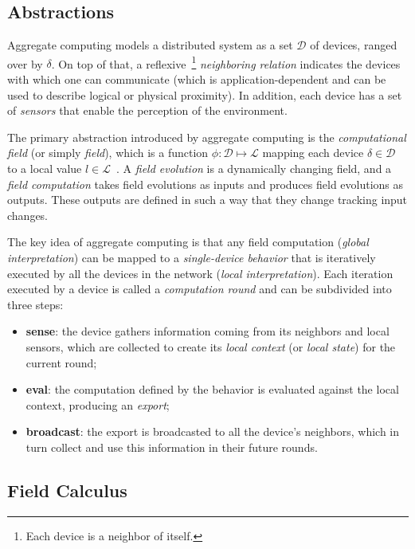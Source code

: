 \subsection{Abstractions}
\label{subsection:abstractions}

Aggregate computing models a distributed system as a set $\mathcal{D}$ of devices, ranged over by $\delta$. On top of that, a reflexive~\footnote{Each device is a neighbor of itself.} \textit{neighboring relation} indicates the devices with which one can communicate (which is application-dependent and can be used to describe logical or physical proximity). In addition, each device has a set of \textit{sensors} that enable the perception of the environment.

The primary abstraction introduced by aggregate computing is the \textit{computational field} (or simply \textit{field}), which is a function $\phi: \mathcal{D} \mapsto \mathcal{L}$ mapping each device $\delta \in \mathcal{D}$ to a local value $l \in \mathcal{L}$~\cite{Viroli2018}.
%
A \textit{field evolution} is a dynamically changing field, and a \textit{field computation} takes field evolutions as inputs and produces field evolutions as outputs.
%
These outputs are defined in such a way that they change tracking input changes.

The key idea of aggregate computing is that any field computation (\textit{global interpretation}) can be mapped to a \textit{single-device behavior} that is iteratively executed by all the devices in the network (\textit{local interpretation}).
%
Each iteration executed by a device is called a \textit{computation round} and can be subdivided into three steps:
%
\begin{itemize}
    \item \textbf{sense}: the device gathers information coming from its neighbors and local sensors, which are collected to create its \textit{local context} (or \textit{local state}) for the current round;
    \item \textbf{eval}: the computation defined by the behavior is evaluated against the local context, producing an \textit{export};
    \item \textbf{broadcast}: the export is broadcasted to all the device's neighbors, which in turn collect and use this information in their future rounds.
\end{itemize}

\subsection{Field Calculus}
\label{subsection:field-calculus}

